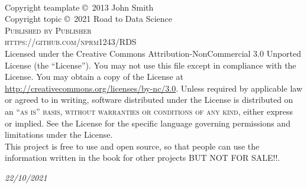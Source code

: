 \documentclass[11pt,fleqn]{book} %
\begin{document}
	
	
	
	
	
	\newpage
	~\vfill
	\thispagestyle{empty}
	
	\noindent Copyright teamplate \copyright\ 2013 John Smith\\ %
	\noindent Copyright topic \copyright\ 2021 Road to Data Science \\ %
	\noindent \textsc{Published by Publisher}\\ %
	
	\noindent \textsc{https://github.com/nprm1243/RDS}\\ %
	
	\noindent Licensed under the Creative Commons Attribution-NonCommercial 3.0 Unported License (the ``License''). You may not use this file except in compliance with the License. You may obtain a copy of the License at \url{http://creativecommons.org/licenses/by-nc/3.0}. Unless required by applicable law or agreed to in writing, software distributed under the License is distributed on an \textsc{``as is'' basis, without warranties or conditions of any kind}, either express or implied. See the License for the specific language governing permissions and limitations under the License.\\ %
	
	\noindent This project is free to use and open source, so that people can use the information written in the book for other projects BUT NOT FOR SALE!!.
	
	\noindent \textit{22/10/2021} %
	
	
	
	
\end{document}
